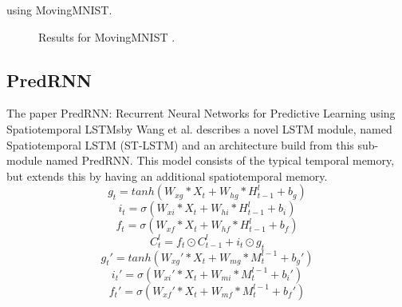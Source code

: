  using MovingMNIST.
 \begin{figure}[H]
   \centering
   \qquad
   \caption{Results for MovingMNIST \cite{Elsayed2018}.}
   \label{figure::elsayed_mnist}
  \end{figure}\noindent
 
 \subsection{PredRNN} \label{subsection::PredRNN}
  The paper \glqq PredRNN: Recurrent Neural Networks for Predictive Learning using Spatiotemporal LSTMs\grqq by Wang et al. \cite{Wang2017} describes a novel
  LSTM module, named Spatiotemporal LSTM (ST-LSTM) and an architecture build from this sub-module named PredRNN.
  This model consists of the typical temporal memory, but extends this by having an additional spatiotemporal memory.
  \begin{equation}
   g_t = tanh(W_{xg} \ast X_t + W_{hg} \ast H_{t-1}^l + b_g)
  \end{equation}
  \begin{equation}
   i_t = \sigma(W_{xi} \ast X_t + W_{hi} \ast H_{t-1}^l +b_i)
  \end{equation}
  \begin{equation}
   f_t = \sigma(W_{xf} \ast X_t + W_{hf} \ast H_{t-1}^l + b_f)
  \end{equation}
  \begin{equation}
   C_t^l = f_t \odot C_{t-1}^l + i_t \odot g_t
  \end{equation}
  \begin{equation}
   g_t\prime = tanh(W_{xg}\prime \ast X_t + W_{mg} \ast M_t^{l-1} + b_g\prime)
  \end{equation}
  \begin{equation}
   i_t\prime = \sigma(W_{xi}\prime \ast X_t + W_{mi} \ast M_t^{l-1} + b_i\prime)
  \end{equation}
  \begin{equation}
   f_t\prime = \sigma(W_{xf}\prime \ast X_t + W_{mf} \ast M_t^{l-1} + b_f\prime)
  \end{equation}
